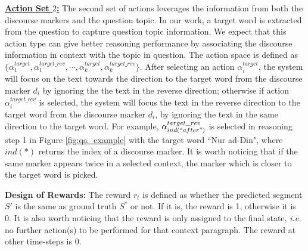  {\bf{\underline{Action Set $2$:}}} The second set of actions leverages the information from both the discourse markers and the question topic. In our work, a target word is extracted from the question to capture question topic information. %
 We expect that this action type can give better reasoning performance by associating the discourse information in context with the topic in question. The action space is defined as $\lbrace\alpha_{1}^{target},\alpha_{1}^{target\_{rev}}, \cdots,\alpha_{k}^{target},\alpha_{k}^{target\_{rev}}\rbrace$. After selecting an action $\alpha_i^{target}$, the system will focus on the text towards the direction to the target word from the discourse marker $d_i$ by ignoring the the text in the reverse direction; otherwise if action $\alpha_i^{target\_{rev}}$ is selected, the system will focus the text in the reverse direction to the target word from the discourse marker $d_i$, by ignoring the text in the same direction to the target word. For example, $\alpha_{ind(``after")}^{target\_{rev}}$ is selected in reasoning step 1 in Figure \ref{fig:qa_example} with the target word ``Nur ad-Din", where $ind(*)$ returns the index of a discourse marker. It is worth noticing that if the same marker appears twice in a  selected context, the marker which is closer to the target word is picked.

 
\textbf{Design of Rewards:} 
The reward $r_t$ is defined as whether the predicted segment $S'$ is the same as ground truth $S^*$ or not.
If it is, the reward is 1, otherwise it is 0. It is also worth noticing that the reward is only assigned to the final state, \emph{i.e.} no further action(s) to be performed for that context paragraph. The reward at other time-steps is 0.


